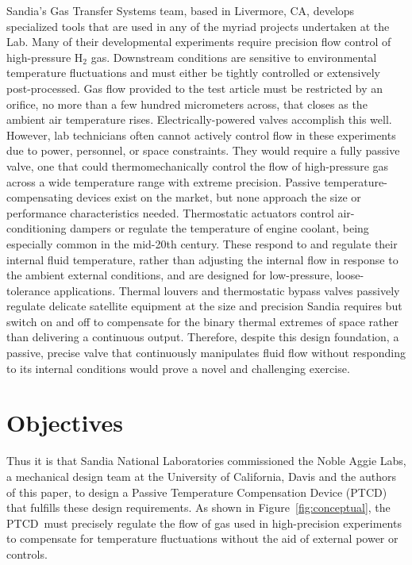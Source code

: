 \documentclass[12pt, letterpaper]{report}%
\newcommand{\device}{PTCD}
\begin{document}
		Sandia's Gas Transfer Systems team, based in Livermore, CA, develops specialized tools that are used in any of the myriad projects undertaken at the Lab.
		Many of their developmental experiments require precision flow control of high-pressure $\text{H}_{\text{2}}$ gas.
		Downstream conditions are sensitive to environmental temperature fluctuations and must either be tightly controlled or extensively post-processed.
		Gas flow provided to the test article must be restricted by an orifice, no more than a few hundred micrometers across, that closes as the ambient air temperature rises.
		Electrically-powered valves accomplish this well.
		However, lab technicians often cannot actively control flow in these experiments due to power, personnel, or space constraints.
		They would require a fully passive valve, one that could thermomechanically control the flow of high-pressure gas across a wide temperature range with extreme precision.
		Passive temperature-compensating devices exist on the market, but none approach the size or performance characteristics needed.
		Thermostatic actuators\cite{ref_ASHRAE_thermostatic, ref_Vernet_1938} control air-conditioning dampers or regulate the temperature of engine coolant, being especially common in the mid-20th century.
		These respond to and regulate their internal fluid temperature, rather than adjusting the internal flow in response to the ambient external conditions,
		and are designed for low-pressure, loose-tolerance applications.
		Thermal louvers and thermostatic bypass valves\cite{ref_Bugby_2021, ref_Ralphs_2024, ref_Ralphs_2026} passively regulate delicate satellite equipment at the size and precision Sandia requires
		but switch on and off to compensate for the binary thermal extremes of space rather than delivering a continuous output.
		Therefore, despite this design foundation, a passive, precise valve that continuously manipulates fluid flow without responding to its internal conditions would prove a novel and challenging exercise.

	\section{Objectives}
	\label{sec:intro:objectives}

		Thus it is that Sandia National Laboratories commissioned the Noble Aggie Labs, a mechanical design team at the University of California, Davis and the authors of this paper,
		to design a Passive Temperature Compensation Device (\device)\cite{ref_sandiaprompt} that fulfills these design requirements.
		As shown in Figure~\ref{fig:conceptual}, the \device\ must precisely regulate the flow of gas used in high-precision experiments
		to compensate for temperature fluctuations without the aid of external power or controls.
\end{document}
